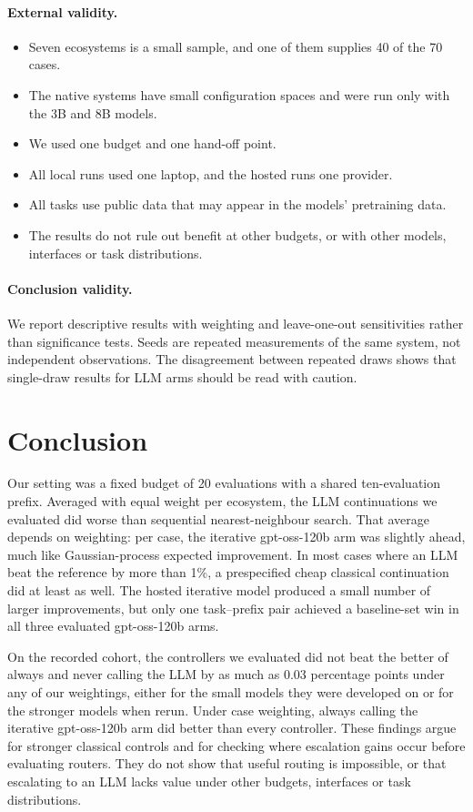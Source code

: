 \paragraph{External validity.}
\begin{itemize}
  \item Seven ecosystems is a small sample, and one of them supplies 40 of the 70 cases.
  \item The native systems have small configuration spaces and were run only with the 3B and 8B models.
  \item We used one budget and one hand-off point.
  \item All local runs used one laptop, and the hosted runs one provider.
  \item All tasks use public data that may appear in the models' pretraining data.
  \item The results do not rule out benefit at other budgets, or with other models, interfaces or task distributions.
\end{itemize}

\paragraph{Conclusion validity.} We report descriptive results with weighting and leave-one-out sensitivities rather than significance tests. Seeds are repeated measurements of the same system, not independent observations. The disagreement between repeated draws shows that single-draw results for LLM arms should be read with caution.

\section{Conclusion}

Our setting was a fixed budget of 20 evaluations with a shared ten-evaluation prefix. Averaged with equal weight per ecosystem, the LLM continuations we evaluated did worse than sequential nearest-neighbour search. That average depends on weighting: per case, the iterative gpt-oss-120b arm was slightly ahead, much like Gaussian-process expected improvement. In most cases where an LLM beat the reference by more than 1\%, a prespecified cheap classical continuation did at least as well. The hosted iterative model produced a small number of larger improvements, but only one task--prefix pair achieved a baseline-set win in all three evaluated gpt-oss-120b arms.

On the recorded cohort, the controllers we evaluated did not beat the better of always and never calling the LLM by as much as 0.03 percentage points under any of our weightings, either for the small models they were developed on or for the stronger models when rerun. Under case weighting, always calling the iterative gpt-oss-120b arm did better than every controller. These findings argue for stronger classical controls and for checking where escalation gains occur before evaluating routers. They do not show that useful routing is impossible, or that escalating to an LLM lacks value under other budgets, interfaces or task distributions.

